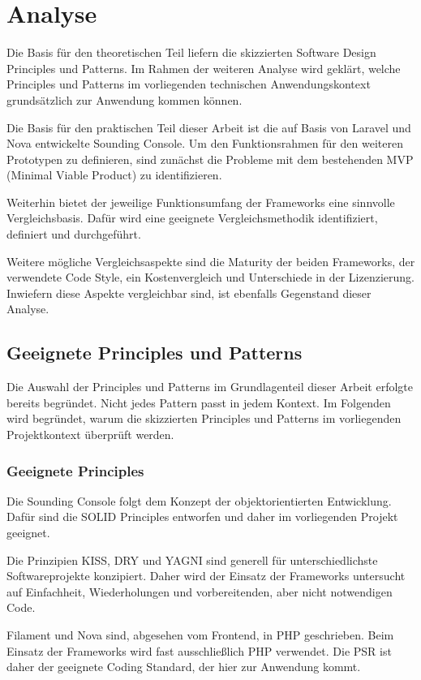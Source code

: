 \newpage

\section{Analyse}
Die Basis für den theoretischen Teil liefern die skizzierten Software Design Principles und Patterns.
Im Rahmen der weiteren Analyse wird geklärt, welche Principles und Patterns im vorliegenden technischen Anwendungskontext grundsätzlich zur Anwendung kommen können.

Die Basis für den praktischen Teil dieser Arbeit ist die auf Basis von Laravel und Nova entwickelte Sounding Console.
Um den Funktionsrahmen für den weiteren Prototypen zu definieren, sind zunächst die Probleme mit dem bestehenden MVP (Minimal Viable Product) zu identifizieren.

Weiterhin bietet der jeweilige Funktionsumfang der Frameworks eine sinnvolle Vergleichsbasis.
Dafür wird eine geeignete Vergleichsmethodik identifiziert, definiert und durchgeführt.

Weitere mögliche Vergleichsaspekte sind die Maturity der beiden Frameworks, der verwendete Code Style, ein Kostenvergleich und Unterschiede in der Lizenzierung.
Inwiefern diese Aspekte vergleichbar sind, ist ebenfalls Gegenstand dieser Analyse.

\subsection{Geeignete Principles und Patterns}
Die Auswahl der Principles und Patterns im Grundlagenteil dieser Arbeit erfolgte bereits begründet.
Nicht jedes Pattern passt in jedem Kontext.
Im Folgenden wird begründet, warum die skizzierten Principles und Patterns im vorliegenden Projektkontext überprüft werden.

\subsubsection{Geeignete Principles}
Die Sounding Console folgt dem Konzept der objektorientierten Entwicklung.
Dafür sind die SOLID Principles entworfen und daher im vorliegenden Projekt geeignet.

Die Prinzipien KISS, DRY und YAGNI sind generell für unterschiedlichste Softwareprojekte konzipiert.
Daher wird der Einsatz der Frameworks untersucht auf Einfachheit, Wiederholungen und vorbereitenden, aber nicht notwendigen Code.

Filament und Nova sind, abgesehen vom Frontend, in PHP geschrieben.
Beim Einsatz der Frameworks wird fast ausschließlich PHP verwendet.
Die PSR ist daher der geeignete Coding Standard, der hier zur Anwendung kommt.

